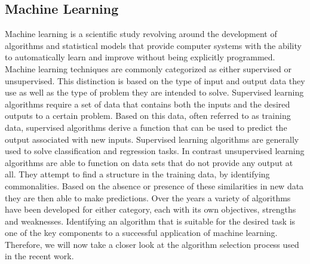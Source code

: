 \newpage

\subsection{Machine Learning}
Machine learning is a scientific study revolving around the development of algorithms and statistical models that provide computer systems with the ability to automatically learn and improve without being explicitly programmed. Machine learning techniques are commonly categorized as either supervised or unsupervised. This distinction is based on the type of input and output data they use as well as the type of problem they are intended to solve. Supervised learning algorithms require a set of data that contains both the inputs and the desired outputs to a certain problem. Based on this data, often referred to as training data, supervised algorithms derive a function that can be used to predict the output associated with new inputs. Supervised learning algorithms are generally used to solve classification and regression tasks. In contrast unsupervised learning algorithms are able to function on data sets that do not provide any output at all. They attempt to find a structure in the training data, by identifying commonalities. Based on the absence or presence of these similarities in new data they are then able to make predictions. 
Over the years a variety of algorithms have been developed for either category, each with its own objectives, strengths and weaknesses. Identifying an algorithm that is suitable for the desired task is one of the key components to a successful application of machine learning. Therefore, we will now take a closer look at the algorithm selection process used in the recent work. 
  

